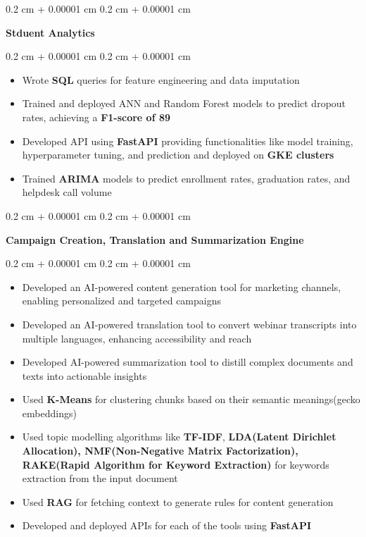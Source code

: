 \documentclass[10pt, letterpaper]{article}
\newenvironment{highlights}{
    \begin{itemize}[
        topsep=0.10 cm,
        parsep=0.10 cm,
        partopsep=0pt,
        itemsep=0pt,
        leftmargin=0.4 cm + 10pt
    ]
}{
    \end{itemize}
} %
\newenvironment{onecolentry}{
    \begin{adjustwidth}{
        0.2 cm + 0.00001 cm
    }{
        0.2 cm + 0.00001 cm
    }
}{
    \end{adjustwidth}
} %
\begin{document}
        \vspace{0.2 cm}

        \begin{onecolentry}
            \textbf{Stduent Analytics}
        \end{onecolentry}
        \vspace{0.10 cm}
        \begin{onecolentry}
            \begin{highlights}
                \item Wrote \textbf{SQL} queries for feature engineering and data imputation
                \item Trained and deployed ANN and Random Forest models to predict dropout rates, achieving a \textbf{F1-score of 89}
                \item Developed API using \textbf{FastAPI} providing functionalities like model training, hyperparameter tuning, and prediction and deployed on \textbf{GKE clusters}
                \item Trained \textbf{ARIMA} models to predict enrollment rates, graduation rates, and helpdesk call volume
            \end{highlights}
        \end{onecolentry}
        
        \vspace{0.2 cm}
        
        \begin{onecolentry}
            \textbf{Campaign Creation, Translation and Summarization Engine}
        \end{onecolentry}
        \vspace{0.10 cm}
        \begin{onecolentry}
            \begin{highlights}
                \item Developed an AI-powered content generation tool for marketing channels, enabling personalized and targeted campaigns
                \item Developed an AI-powered translation tool to convert webinar transcripts into multiple languages, enhancing accessibility and reach
                \item Developed AI-powered summarization tool to distill complex documents and texts into actionable insights
                \item Used \textbf{K-Means} for clustering chunks based on their semantic meanings(gecko embeddings)
                \item Used topic modelling algorithms like \textbf{TF-IDF}, \textbf{LDA(Latent Dirichlet Allocation), NMF(Non-Negative Matrix Factorization), RAKE(Rapid Algorithm for Keyword Extraction)} for keywords extraction from the input document
                \item Used \textbf{RAG} for fetching context to generate rules for content generation
                \item Developed and deployed APIs for each of the tools using \textbf{FastAPI}
            \end{highlights}
        \end{onecolentry}
        
\end{document}

